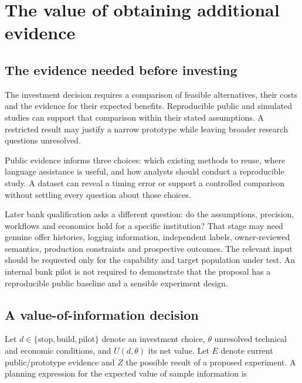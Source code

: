 \hypertarget{pd15:investment}{%
\section{The value of obtaining additional evidence}\label{pd15:investment}}

\hypertarget{proposal-acceptance-and-later-qualification}{%
\subsection{The evidence needed before investing}\label{proposal-acceptance-and-later-qualification}}

The investment decision requires a comparison of feasible alternatives,
their costs and the evidence for their expected benefits. Reproducible
public and simulated studies can support that comparison within their
stated assumptions. A restricted result may justify a narrow prototype
while leaving broader research questions unresolved.

Public evidence informs three choices: which existing methods to reuse,
where language assistance is useful, and how analysts should conduct a
reproducible study. A dataset can reveal a timing error or support a
controlled comparison without settling every question about those choices.

Later bank qualification asks a different question: do the assumptions,
precision, workflows and economics hold for a specific institution? That
stage may need genuine offer histories, logging information, independent
labels, owner-reviewed semantics, production constraints and prospective
outcomes. The relevant input should be requested only for the capability
and target population under test. An internal bank pilot is not required
to demonstrate that the proposal has a reproducible public baseline and
a sensible experiment design.

\hypertarget{a-value-of-information-decision}{%
\subsection{A value-of-information
decision}\label{a-value-of-information-decision}}

Let \(d\in\{\text{stop},\text{build},\text{pilot}\}\) denote an
investment choice, \(\theta\) unresolved technical and economic
conditions, and \(U(d,\theta)\) its net value. Let \(E\) denote current
public/prototype evidence and \(Z\) the possible result of a proposed
experiment. A planning expression for the expected value of sample
information is

